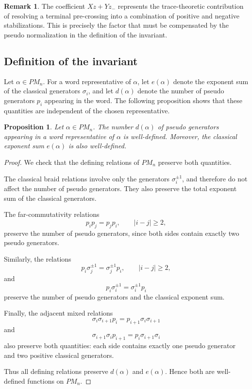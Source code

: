\documentclass[11pt]{article}
\numberwithin{equation}{section}
\newtheorem{proposition}[theorem]{Proposition}
\theoremstyle{definition}
\newtheorem{remark}[theorem]{Remark}
\begin{document}
\begin{remark}
The coefficient \( Xz+Yz_-\) represents the trace-theoretic contribution of resolving a terminal pre-crossing into a combination of positive and negative stabilizations. This is precisely the factor that must be compensated by the pseudo normalization in the definition of the invariant.
\end{remark}


\subsection{Definition of the invariant}

Let \(\alpha\in PM_n\). For a word representative of \(\alpha\), let \(e(\alpha)\) denote the exponent sum of the classical generators \(\sigma_i\), and let \(d(\alpha)\) denote the number of pseudo generators \(p_i\) appearing in the word. The following proposition shows that these quantities are independent of the chosen representative.

\begin{proposition}
Let \(\alpha\in PM_n\). The number \(d(\alpha)\) of pseudo generators appearing in a word representative of \(\alpha\) is well-defined. Moreover, the classical exponent sum \(e(\alpha)\) is also well-defined.
\end{proposition}

\begin{proof}
We check that the defining relations of \(PM_n\) preserve both quantities.

The classical braid relations involve only the generators
\(\sigma_i^{\pm1}\), and therefore do not affect the number of pseudo
generators. They also preserve the total exponent sum of the classical
generators.

The far-commutativity relations
\[
p_i p_j=p_j p_i,
\qquad |i-j|\geq 2,
\]
preserve the number of pseudo generators, since both sides contain exactly
two pseudo generators.

Similarly, the relations
\[
p_i\sigma_j^{\pm1}=\sigma_j^{\pm1}p_i,
\qquad |i-j|\geq 2,
\]
and
\[
p_i\sigma_i^{\pm1}=\sigma_i^{\pm1}p_i
\]
preserve the number of pseudo generators and the classical exponent sum.

Finally, the adjacent mixed relations
\[
\sigma_i\sigma_{i+1}p_i=p_{i+1}\sigma_i\sigma_{i+1}
\]
and
\[
\sigma_{i+1}\sigma_i p_{i+1}=p_i\sigma_{i+1}\sigma_i
\]
also preserve both quantities: each side contains exactly one pseudo
generator and two positive classical generators.

Thus all defining relations preserve \(d(\alpha)\) and \(e(\alpha)\).
Hence both are well-defined functions on \(PM_n\).
\end{proof}
\end{document}
